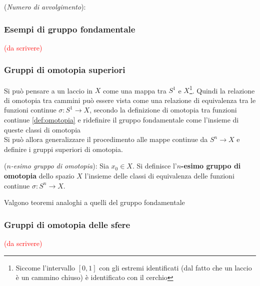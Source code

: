 \begin{definition}(\emph{Numero di avvolgimento}):

\end{definition}
\subsubsection{Esempi di gruppo fondamentale}
\textcolor{red}{(da scrivere)}
\subsubsection{Gruppi di omotopia superiori}
Si può pensare a un laccio in $X$ come una mappa tra $S^1$ e $X$\footnote{
Siccome l'intervallo $[0,1]$ con gli estremi identificati
(dal fatto che un laccio è un cammino chiuso) è identificato con il cerchio}.
Quindi la relazione di omotopia tra cammini può essere vista come una relazione
di equivalenza tra le funzioni continue $\sigma : S^1 \to X$, secondo la definizione
di omotopia tra funzioni continue \ref{def:omotopia} e ridefinire
il gruppo fondamentale come l'insieme di queste classi di omotopia\\

Si può allora generalizzare il procedimento alle mappe continue da $S^n \to X$ e
definire i gruppi superiori di omotopia.

\begin{definition}(\emph{$n$-esimo gruppo di omotopia}):
   Sia $x_0 \in X$. Si definisce l'\textbf{$n$-esimo gruppo di omotopia}
   dello spazio $X$ l'insieme delle classi di equivalenza delle funzioni continue
   $\sigma : S^n \to X$.
\end{definition}

Valgono teoremi analoghi a quelli del gruppo fondamentale

\subsubsection{Gruppi di omotopia delle sfere}
\textcolor{red}{(da scrivere)}
